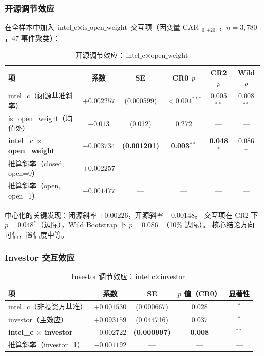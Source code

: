 \documentclass[11pt,fontset=fandol,a4paper]{ctexart}
\begin{document}
\subsubsection{开源调节效应}

在全样本中加入 $\text{intel\_c}\times\text{is\_open\_weight}$ 交互项（因变量 $\text{CAR}_{[0,+20]}$，$n=3{,}780$，47 事件聚类）：

\begin{table}[htbp]
\centering
\caption{开源调节效应：$\text{intel\_c}\times\text{open\_weight}$}
\label{tab:int_open}
\small
\begin{tabular}{lccccc}
\toprule
项 & 系数 & SE & CR0 $p$ & CR2 $p$ & Wild $p$ \\
\midrule
intel\_c（闭源基准斜率）  & $+0.002257$ & (0.000599) & $<0.001^{***}$ & 0.005$^{**}$ & 0.008$^{**}$ \\
is\_open\_weight（均值处）& $-0.013$    & (0.012)    & 0.272          & ---           & --- \\
\textbf{intel\_c $\times$ open\_weight} & \textbf{$-0.003734$} & \textbf{(0.001201)} & \textbf{0.003$^{**}$} & \textbf{0.048$^{*}$} & 0.086$^{+}$ \\
\midrule
推算斜率（closed, open=0）& $+0.002257$ & --- & --- & --- & --- \\
推算斜率（open, open=1）  & $-0.001477$ & --- & --- & --- & --- \\
\bottomrule
\end{tabular}
\end{table}

中心化的关键发现：闭源斜率 $+0.00226$，开源斜率 $-0.00148$。
交互项在 CR2 下 $p=0.048^{*}$（边际），Wild Bootstrap 下 $p=0.086^{+}$（10\% 边际）。
核心结论方向可信，置信度中等。

\subsubsection{Investor 交互效应}

\begin{table}[htbp]
\centering
\caption{Investor 调节效应：$\text{intel\_c}\times\text{investor}$}
\label{tab:int_inv}
\small
\begin{tabular}{lcccc}
\toprule
项 & 系数 & SE & $p$ 值（CR0） & 显著性 \\
\midrule
intel\_c（非投资方基准） & $+0.001530$ & (0.000667) & 0.028 & $^{*}$ \\
investor（主效应）       & $+0.093159$ & (0.044716) & 0.037 & $^{*}$ \\
\textbf{intel\_c $\times$ investor} & \textbf{$-0.002722$} & \textbf{(0.000997)} & \textbf{0.008} & \textbf{$^{**}$} \\
\midrule
推算斜率（investor=1）    & $-0.001192$ & --- & --- & --- \\
\bottomrule
\end{tabular}
\end{table}
\end{document}
